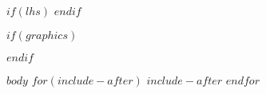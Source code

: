 



$if(lhs)$
$endif$

$if(graphics)$

\makeatletter
\def\maxwidth{\ifdim\Gin@nat@width>\linewidth\linewidth
\else\Gin@nat@width\fi}
\makeatother
\let\Oldincludegraphics\includegraphics
\renewcommand{\includegraphics}[1]{\Oldincludegraphics[width=\maxwidth]{#1}}
$endif$

\VerbatimFootnotes

\setlength{\parindent}{0pt}
\setlength{\parskip}{6pt plus 2pt minus 1pt}
\setlength{\emergencystretch}{3em}  %
\providecommand{\tightlist}{%
  \setlength{\itemsep}{0pt}\setlength{\parskip}{0pt}}
\VerbatimFootnotes %




\setcounter{page}{1}


\tableofcontents
\newpage

$body$
$for(include-after)$
  $include-after$
$endfor$





